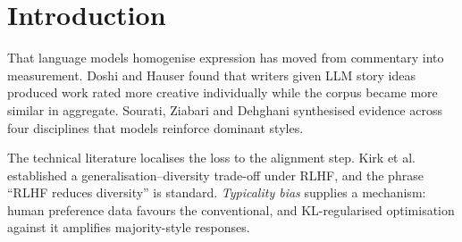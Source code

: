 \documentclass[11pt]{article}
\begin{document}
\begin{abstract}
\paragraph{Where you measure changes the answer.} Scoring the same checkpoints on
the same prompts, T\"ulu-3-8B's preference stage accounts for 29.2\% [22.4, 35.0]
of total entropy loss at a chat-template position and 52.8\% [50.5, 55.4] over
generated continuations. Prompt-final scoring, closest to common practice, gives
confidence intervals 4.5--6$\times$ wider because it averages one position per
prompt rather than $\sim$190, and on the 1B model it falls 18--28 points below
every other convention. We have not found a published stage comparison that
reports this choice.

We also report two decoding-time interventions and a correction to our own earlier
work. Extrapolating along the base--aligned logit axis recovers diversity at a
third of the fluency cost of temperature at 135M (3.00$\times$, 95\% CI
[1.58, 5.14]) and does not survive to 1B (1.04$\times$, [0.73, 1.50], $n = 12$,
Wilcoxon $p = 0.97$). Reference subtraction, which an earlier draft reported as
catastrophic, is not: at matched diversity it sits at 0.98$\times$ the temperature
frontier, and the earlier figure compared it against $T = 1.0$ instead.
Plausible-set $\psi$ never exceeds 0.281 across four models, four stage deltas and
three conventions.
\end{abstract}

\section{Introduction}

That language models homogenise expression has moved from commentary into
measurement. Doshi and Hauser \cite{doshi2024} found that writers given LLM story
ideas produced work rated more creative individually while the corpus became more
similar in aggregate. Sourati, Ziabari and Dehghani \cite{sourati2026} synthesised
evidence across four disciplines that models reinforce dominant styles.

The technical literature localises the loss to the alignment step. Kirk et al.\
\cite{kirk2024} established a generalisation--diversity trade-off under RLHF, and
the phrase ``RLHF reduces diversity'' is standard. \emph{Typicality bias}
\cite{zhang2025} supplies a mechanism: human preference data favours the
conventional, and KL-regularised optimisation against it amplifies majority-style
responses.
\end{document}
